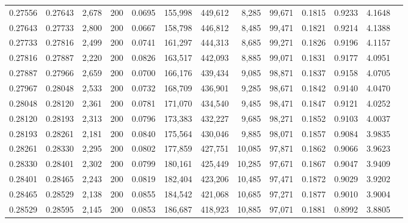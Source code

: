\begin{tabular}{rrrrrrrrrrrrr}
0.27556 & 0.27643 & 2,678 & 200 &                                     0.0695 & 155,998 & 449,612 &   8,285 &  99,671 & 0.1815 & 0.9233 & 4.1648 \\
0.27643 & 0.27733 & 2,800 & 200 &                                     0.0667 & 158,798 & 446,812 &   8,485 &  99,471 & 0.1821 & 0.9214 & 4.1388 \\
0.27733 & 0.27816 & 2,499 & 200 &                                     0.0741 & 161,297 & 444,313 &   8,685 &  99,271 & 0.1826 & 0.9196 & 4.1157 \\
0.27816 & 0.27887 & 2,220 & 200 &                                     0.0826 & 163,517 & 442,093 &   8,885 &  99,071 & 0.1831 & 0.9177 & 4.0951 \\
0.27887 & 0.27966 & 2,659 & 200 &                                     0.0700 & 166,176 & 439,434 &   9,085 &  98,871 & 0.1837 & 0.9158 & 4.0705 \\
0.27967 & 0.28048 & 2,533 & 200 &                                     0.0732 & 168,709 & 436,901 &   9,285 &  98,671 & 0.1842 & 0.9140 & 4.0470 \\
0.28048 & 0.28120 & 2,361 & 200 &                                     0.0781 & 171,070 & 434,540 &   9,485 &  98,471 & 0.1847 & 0.9121 & 4.0252 \\
0.28120 & 0.28193 & 2,313 & 200 &                                     0.0796 & 173,383 & 432,227 &   9,685 &  98,271 & 0.1852 & 0.9103 & 4.0037 \\
0.28193 & 0.28261 & 2,181 & 200 &                                     0.0840 & 175,564 & 430,046 &   9,885 &  98,071 & 0.1857 & 0.9084 & 3.9835 \\
0.28261 & 0.28330 & 2,295 & 200 &                                     0.0802 & 177,859 & 427,751 &  10,085 &  97,871 & 0.1862 & 0.9066 & 3.9623 \\
0.28330 & 0.28401 & 2,302 & 200 &                                     0.0799 & 180,161 & 425,449 &  10,285 &  97,671 & 0.1867 & 0.9047 & 3.9409 \\
0.28401 & 0.28465 & 2,243 & 200 &                                     0.0819 & 182,404 & 423,206 &  10,485 &  97,471 & 0.1872 & 0.9029 & 3.9202 \\
0.28465 & 0.28529 & 2,138 & 200 &                                     0.0855 & 184,542 & 421,068 &  10,685 &  97,271 & 0.1877 & 0.9010 & 3.9004 \\
0.28529 & 0.28595 & 2,145 & 200 &                                     0.0853 & 186,687 & 418,923 &  10,885 &  97,071 & 0.1881 & 0.8992 & 3.8805 \\

\end{tabular}

